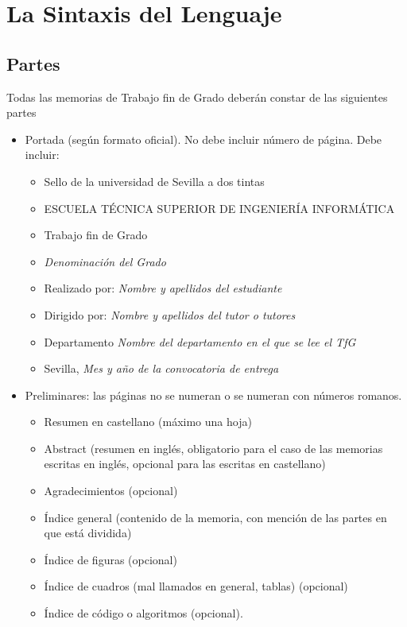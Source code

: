 
\chapter{La Sintaxis del Lenguaje}

\section{Partes}\label{sec:partes}

Todas las memorias de Trabajo fin de Grado deberán constar de las siguientes partes 
\begin{itemize}
 \item Portada (seg\'un formato oficial). No debe incluir n\'umero de p\'agina. Debe incluir:
 \begin{itemize}
 \item Sello de la universidad de Sevilla a dos tintas
 \item ESCUELA T\'ECNICA SUPERIOR DE INGENIER\'IA INFORM\'ATICA
 \item Trabajo fin de Grado
 \item \emph{Denominaci\'on del Grado}
 \item Realizado por: \emph{Nombre y apellidos del estudiante}
 \item Dirigido por: \emph{Nombre y apellidos del tutor o tutores}
 \item Departamento \emph{Nombre del departamento en el que se lee el TfG}
 \item Sevilla, \emph{Mes y año de la convocatoria de entrega}
 \end{itemize}
  \item Preliminares: las p\'aginas no se numeran o se numeran con n\'umeros romanos.
 \begin{itemize} 
\item Resumen en castellano (m\'aximo una hoja)
 \item Abstract (resumen en ingl\'es, obligatorio para el caso de las memorias escritas en ingl\'es, opcional
 para las escritas en castellano)
 \item Agradecimientos (opcional)
 \item \'Indice general (contenido de la memoria, con menci\'on de las partes en que está dividida)
 \item \'Indice de figuras (opcional)
 \item \'Indice de cuadros (mal llamados en general, tablas) (opcional)
 \item \'Indice de c\'odigo o algoritmos (opcional). 

\end{itemize}
\end{itemize}
